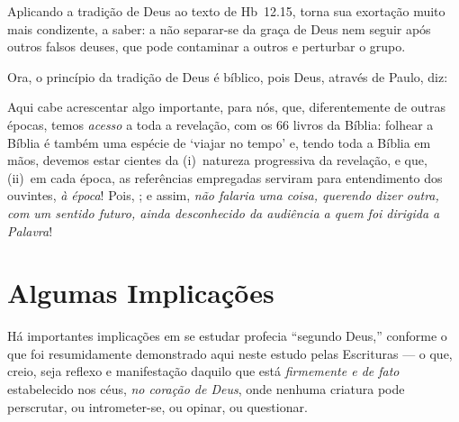
    Aplicando a tradição de Deus ao texto de Hb~12.15, torna sua exortação muito mais condizente, a saber: a não separar-se da
    graça de Deus nem seguir após outros falsos deuses, que pode contaminar a outros e perturbar o grupo.

    Ora, o princípio da tradição de Deus é bíblico, pois Deus, através de Paulo, diz:


    Aqui cabe acrescentar algo importante, para nós, que,  diferentemente  de  outras  épocas,  temos  \emph{acesso}  a  toda  a
    revelação, com os 66 livros da Bíblia: folhear a Bíblia é também uma espécie de `viajar no tempo' e, tendo toda a Bíblia  em
    mãos, devemos estar cientes da (i)~natureza progressiva da revelação, e que, (ii)~em cada época, as  referências  empregadas
    serviram  para  entendimento  dos  ouvintes,  \emph{à  época}!  Pois,  ; e assim, \emph{não falaria uma coisa, querendo dizer outra, com um  sentido  futuro,  ainda
    desconhecido da audiência a quem foi dirigida a Palavra}!
    


\section{Algumas Implicações}

    Há importantes implicações em se estudar profecia ``segundo Deus,'' conforme o que foi resumidamente demonstrado aqui  neste
    estudo pelas Escrituras --- o que, creio, seja  reflexo  e  manifestação  daquilo  que  está  \emph{firmemente  e  de  fato}
    estabelecido nos céus, \emph{no coração de Deus}, onde nenhuma criatura pode perscrutar, ou  intrometer-se,  ou  opinar,  ou
    questionar.

